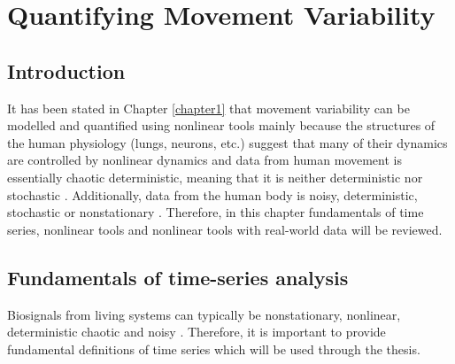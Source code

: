
\chapter{Quantifying Movement Variability} \label{chapter2}

%


\section{Introduction}


It has been stated in Chapter \ref{chapter1} that movement variability can 
be modelled
and quantified using nonlinear tools mainly because the structures of the 
human physiology (lungs, neurons, etc.) suggest that many of their dynamics 
are controlled by nonlinear dynamics \citep{goldberger1990}
and data from human movement is essentially chaotic deterministic, 
meaning that it is neither deterministic nor stochastic 
\citep{hatze1986, preatoni2010, preatoni2013, stergiou2006}. 
Additionally, data from the human body is noisy, deterministic, stochastic 
or nonstationary 
\citep{newell1998,stergiou2011, preatoni2010, preatoni2013,caballero2014}.
Therefore, in this chapter fundamentals of time series, nonlinear tools and
nonlinear tools with real-world data will be reviewed.


%

\section{Fundamentals of time-series analysis}
Biosignals from living systems can typically be nonstationary, nonlinear, 
deterministic chaotic and noisy \citep{klonowski2007, caballero2014, 
wijnants2009, gomezgarcia2014, stergiou2006, harbourne2009, stergiou2011,
hatze1986, newell1998}. Therefore, it is important to provide fundamental 
definitions of time series which will be used through the thesis.

